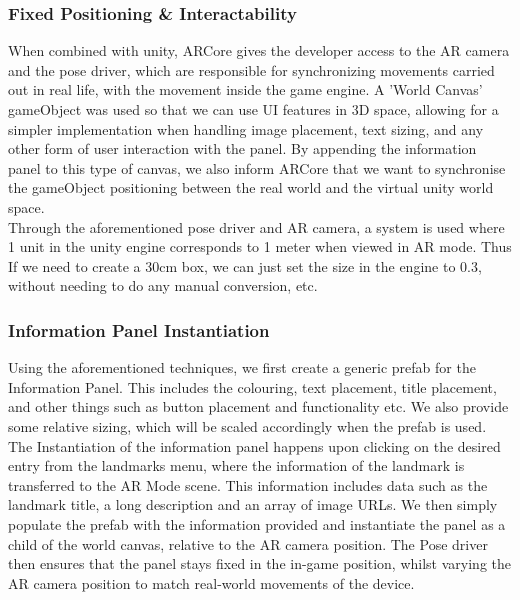 \subsubsection{Fixed Positioning \& Interactability}
When combined with unity, ARCore gives the developer access to the AR camera and the pose driver, which are responsible for synchronizing movements 
carried out in real life, with the movement inside the game engine. A 'World Canvas' gameObject was used so that we can use UI features in 3D space, allowing for a simpler implementation when 
handling image placement, text sizing, and any other form of user interaction with the panel. By appending the information panel to this type of canvas, we also inform ARCore that 
we want to synchronise the gameObject positioning between the real world and the virtual unity world space.\\
\noindent
Through the aforementioned pose driver and AR camera, a system is used where 1 unit in the unity engine corresponds to 1 meter when
viewed in AR mode. Thus If we need to create a 30cm box, we can just set the size in the engine to 0.3, without needing to do any manual conversion, etc.

\subsubsection{Information Panel Instantiation}
Using the aforementioned techniques, we first create a generic prefab for the Information Panel. This includes the colouring, text placement, title placement, and 
other things such as button placement and functionality etc. We also provide some relative sizing, which will be scaled accordingly when the prefab is used.\\ 
The Instantiation of the information panel happens upon clicking on the desired entry from the landmarks menu, where the information of the landmark is transferred to the AR Mode scene.
This information includes data such as the landmark title, a long description and an array of image URLs. We then simply populate the prefab with the information provided and instantiate 
the panel as a child of the world canvas, relative to the AR camera position. 
The Pose driver then ensures that the panel stays fixed in the in-game position, whilst varying the AR camera position to 
match real-world movements of the device. 



